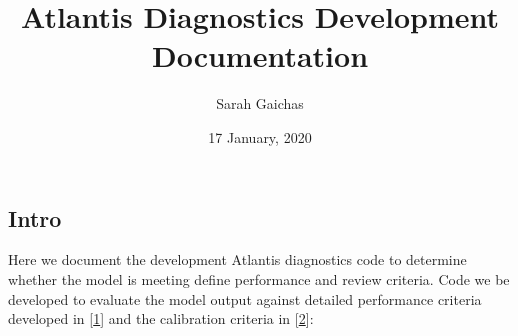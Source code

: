 \documentclass[
]{article}
\title{Atlantis Diagnostics Development Documentation}
\author{Sarah Gaichas}
\date{17 January, 2020}
\begin{document}
\maketitle

\hypertarget{intro}{%
\subsection{Intro}\label{intro}}

Here we document the development Atlantis diagnostics code to determine
whether the model is meeting define performance and review criteria.
Code we be developed to evaluate the model output against detailed
performance criteria developed in
{[}\protect\hyperlink{ref-kaplan_guinea_2016}{1}{]} and the calibration
criteria in
{[}\protect\hyperlink{ref-pethybridge_calibrating_2019}{2}{]}:
\end{document}
